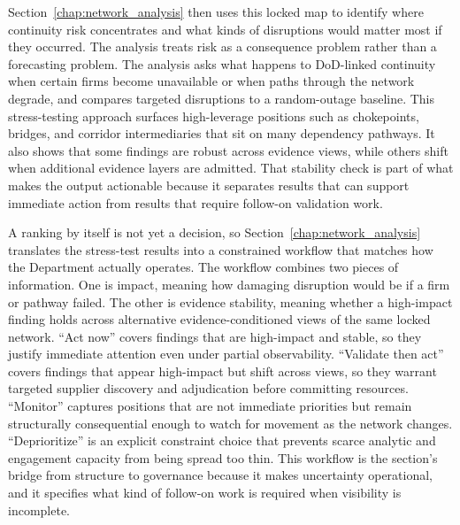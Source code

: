 Section~\ref{chap:network_analysis} then uses this locked map to identify where continuity risk concentrates and what kinds of disruptions would matter most if they occurred. The analysis treats risk as a consequence problem rather than a forecasting problem. The analysis asks what happens to DoD-linked continuity when certain firms become unavailable or when paths through the network degrade, and compares targeted disruptions to a random-outage baseline. This stress-testing approach surfaces high-leverage positions such as chokepoints, bridges, and corridor intermediaries that sit on many dependency pathways. It also shows that some findings are robust across evidence views, while others shift when additional evidence layers are admitted. That stability check is part of what makes the output actionable because it separates results that can support immediate action from results that require follow-on validation work.

A ranking by itself is not yet a decision, so Section~\ref{chap:network_analysis} translates the stress-test results into a constrained workflow that matches how the Department actually operates. The workflow combines two pieces of information. One is impact, meaning how damaging disruption would be if a firm or pathway failed. The other is evidence stability, meaning whether a high-impact finding holds across alternative evidence-conditioned views of the same locked network. ``Act now'' covers findings that are high-impact and stable, so they justify immediate attention even under partial observability. ``Validate then act'' covers findings that appear high-impact but shift across views, so they warrant targeted supplier discovery and adjudication before committing resources. ``Monitor'' captures positions that are not immediate priorities but remain structurally consequential enough to watch for movement as the network changes. ``Deprioritize'' is an explicit constraint choice that prevents scarce analytic and engagement capacity from being spread too thin. This workflow is the section's bridge from structure to governance because it makes uncertainty operational, and it specifies what kind of follow-on work is required when visibility is incomplete.


